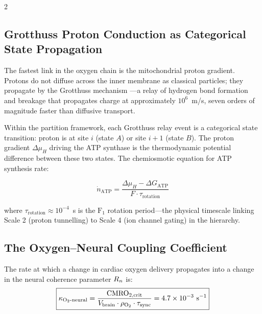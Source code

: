 \begin{multicols}{2}

\subsection{Grotthuss Proton Conduction as Categorical State Propagation}

The fastest link in the oxygen chain is the mitochondrial proton
gradient. Protons do not diffuse across the inner membrane as classical
particles; they propagate by the Grotthuss mechanism
\citep{grotthuss1806memoire,agmon1995grotthuss}---a relay of hydrogen
bond formation and breakage that propagates charge at approximately
$10^6$~m/s, seven orders of magnitude faster than diffusive transport.

Within the partition framework, each Grotthuss relay event is a
categorical state transition: proton is at site $i$ (state $A$) or
site $i+1$ (state $B$). The proton gradient $\Delta\mu_H$ driving
the ATP synthase \citep{boyer1997atp,stock1999molecular} is the
thermodynamic potential difference between these two states. The
chemiosmotic equation for ATP synthesis rate:

\begin{equation}
\dot{n}_{\mathrm{ATP}} = \frac{\Delta\mu_H - \Delta G_{\mathrm{ATP}}}
{F \cdot \tau_{\mathrm{rotation}}}
\label{eq:ch09-ATP}
\end{equation}

where $\tau_{\mathrm{rotation}} \approx 10^{-4}$~s is the
$\mathrm{F}_1$ rotation period---the physical timescale linking
Scale 2 (proton tunnelling) to Scale 4 (ion channel gating) in the
hierarchy.

\columnbreak

\subsection{The Oxygen--Neural Coupling Coefficient}

\begin{theorem}
\label{thm:ch09-kappa}
The rate at which a change in cardiac oxygen delivery propagates into
a change in the neural coherence parameter $R_n$ is:
\begin{equation}
\boxed{\kappa_{\mathrm{O_2\text{-}neural}} = \frac{\mathrm{CMRO}_{2,\mathrm{crit}}}{V_{\mathrm{brain}} \cdot \rho_{\mathrm{O}_2} \cdot \tau_{\mathrm{sync}}} = 4.7\times10^{-3}~\mathrm{s}^{-1}}
\label{eq:ch09-kappa}
\end{equation}
\end{theorem}


\end{multicols}
